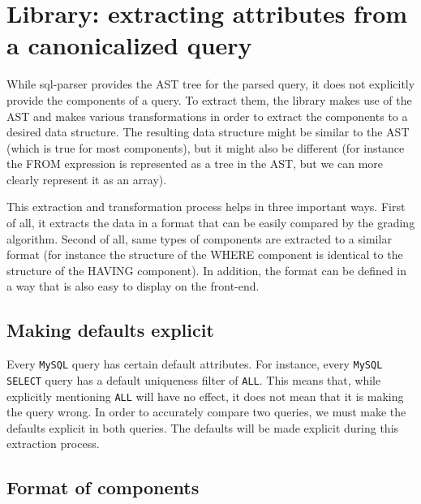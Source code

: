 \section{Library: extracting attributes from a canonicalized query}

While sql-parser provides the AST tree for the parsed query, it does not explicitly provide the components of a query. To extract them, the library makes use of the AST and makes various transformations in order to extract the components to a desired data structure. The resulting data structure might be similar to the AST (which is true for most components), but it might also be different (for instance the FROM expression is represented as a tree in the AST, but we can more clearly represent it as an array).

This extraction and transformation process helps in three important ways. First of all, it extracts the data in a format that can be easily compared by the grading algorithm. Second of all, same types of components are extracted to a similar format (for instance the structure of the WHERE component is identical to the structure of the HAVING component). In addition, the format can be defined in a way that is also easy to display on the front-end.

\subsection{Making defaults explicit}

Every \texttt{MySQL} query has certain default attributes. For instance, every \texttt{MySQL SELECT} query has a default uniqueness filter of \texttt{ALL}. This means that, while explicitly mentioning \texttt{ALL} will have no effect, it does not mean that it is making the query wrong. In order to accurately compare two queries, we must make the defaults explicit in both queries. The defaults will be made explicit during this extraction process.

\subsection{Format of components}

